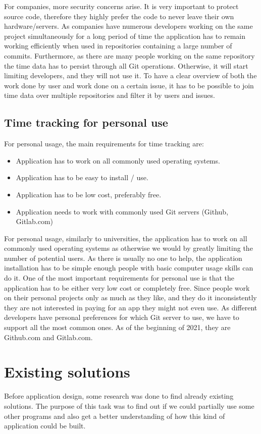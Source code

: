 For companies, more security concerns arise.
It is very important to protect source code, therefore they highly prefer the code to never leave their own hardware/servers.
As companies have numerous developers working on the same project simultaneously for a long period of time the application has to
remain working efficiently when used in repositories containing a large number of commits.
Furthermore, as there are many people working on the same repository the time data has to persist through all Git operations.
Otherwise, it will start limiting developers, and they will not use it.
To have a clear overview of both the work done by user and work done on a certain issue, it has to be possible to join time data over
multiple repositories and filter it by users and issues.

\subsection{Time tracking for personal use}\label{subsec:time-tracking-for-personal-use}
For personal usage, the main requirements for time tracking are:
\begin{itemize}
    \item Application has to work on all commonly used operating systems.
    \item Application has to be easy to install / use.
    \item Application has to be low cost, preferably free.
    \item Application needs to work with commonly used Git servers (Github, Gitlab.com)
\end{itemize}

For personal usage, similarly to universities, the application has to work on all commonly used operating systems as otherwise we
would by greatly limiting the number of potential users.
As there is usually no one to help, the application installation has to be simple enough people with basic computer usage skills can do it.
One of the most important requirements for personal use is that the application has to be either very low cost or completely free.
Since people work on their personal projects only as much as they like, and they do it inconsistently they are not interested in paying for an app they might not even use.
As different developers have personal preferences for which Git server to use, we have to support all the most common ones.
As of the beginning of 2021, they are Github.com and Gitlab.com.


\section{Existing solutions}\label{sec:existing-solutions}
Before application design, some research was done to find already existing solutions.
The purpose of this task was to find out if we could partially use some other programs and also get a better understanding of how
this kind of application could be built.


